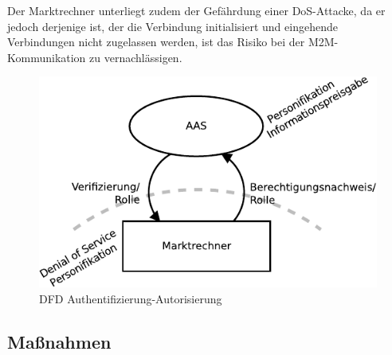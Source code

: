 \documentclass[11pt,a4paper]{report}
\begin{document}
Der Marktrechner unterliegt zudem der Gefährdung einer DoS-Attacke, da er jedoch derjenige ist, der die Verbindung initialisiert und eingehende Verbindungen nicht zugelassen werden, ist das Risiko bei der M2M-Kommunikation zu vernachlässigen.

\begin{figure}[htbp]
\centering
\includegraphics[scale=1.1]{images/dfd_auth_threat.pdf}
\caption{DFD Authentifizierung-Autorisierung}
\label{fig:dfd_auth_threat}
\end{figure}

\subsection{Maßnahmen}
\end{document}
